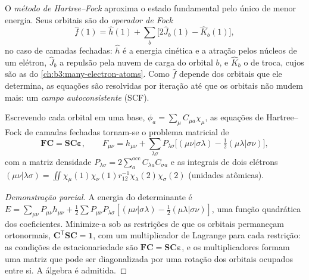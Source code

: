 \begin{definition}\label{def:b3:computational-chemistry:hartree-fock}
O \emph{método de Hartree--Fock} aproxima o
estado fundamental pelo  único de menor energia. Seus
orbitais são  do \emph{operador de Fock}
\[
\hat f(1) = \hat h(1) + \sum_b\big[2\hat J_b(1) - \hat K_b(1)\big],
\]
no caso de camadas fechadas: $\hat h$ é a energia cinética e a atração pelos
núcleos de um elétron, $\hat J_b$ a repulsão pela nuvem de carga do
orbital $b$, e $\hat K_b$ o  de troca, cujos  são
as  do \cref{ch:b3:many-electron-atoms}. Como $\hat f$
depende dos orbitais que ele determina, as equações são resolvidas por
iteração até que os orbitais não mudem mais: um \emph{campo
autoconsistente} (SCF).
\end{definition}

\begin{theorem}\label{thm:b3:computational-chemistry:roothaan}
Escrevendo cada orbital em uma base, $\phi_a = \sum_\mu C_{\mu a}\chi_\mu$, as
equações de Hartree--Fock de camadas fechadas tornam-se o problema matricial de 
\[
\mathbf F\mathbf C = \mathbf S\mathbf C\boldsymbol\varepsilon, \qquad F_{\mu\nu} =
h_{\mu\nu} + \sum_{\lambda\sigma}P_{\lambda\sigma}\big[(\mu\nu|\sigma\lambda) -
\tfrac12(\mu\lambda|\sigma\nu)\big],
\]
com a matriz densidade $P_{\lambda\sigma} = 2\sum_a^{\mathrm{occ}}C_{\lambda a}C_{\sigma
a}$ e as integrais de dois elétrons $(\mu\nu|\lambda\sigma) = \iint\chi_\mu(1)\chi_\nu(1)
r_{12}^{-1}\chi_\lambda(2)\chi_\sigma(2)$ (unidades atômicas).
\end{theorem}

\begin{proof}[Demonstração parcial]
A energia do determinante é $E = \sum_{\mu\nu}P_{\mu\nu}h_{\mu\nu} + \frac12
\sum P_{\mu\nu}P_{\lambda\sigma}[(\mu\nu|\sigma\lambda) - \frac12(\mu\lambda|\sigma\nu)]$, uma
função quadrática dos coeficientes. Minimize-a sob as restrições de que os
orbitais permaneçam ortonormais, $\mathbf C^{\mathsf T}\mathbf S\mathbf C = \mathbf 1$,
com um multiplicador de Lagrange para cada restrição: as condições de
estacionariedade são $\mathbf F\mathbf C = \mathbf S\mathbf C\boldsymbol\varepsilon$, e
os multiplicadores formam uma matriz que pode ser diagonalizada por uma rotação
dos orbitais ocupados entre si. A álgebra é admitida.
\end{proof}

